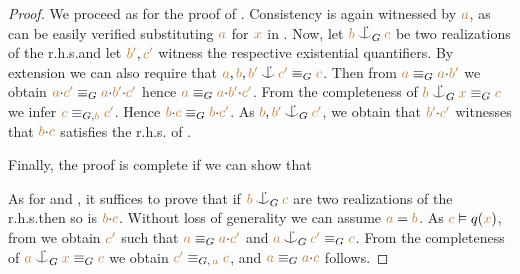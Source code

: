 \documentclass[creche.tex]{subfiles}
\begin{document}
\begin{proof}
We proceed as for the proof of .
Consistency is again witnessed by ${\color{brown} a}$, as can be easily verified substituting ${\color{brown} a}$ for ${\color{brown} x}$ in .
Now, let ${\mr b}\nonforkc_G{\mr c}$ be two realizations of the r.h.s.\@ and let ${\color{brown} b'},{\color{brown} c'}$ witness the respective existential quantifiers.
By extension we can also require that ${\mr a},{\mr b},{\mr b'}\nonforkc{\mr c'}\equiv_{G}{\mr c}$.
Then from ${\color{brown} a}\equiv_G{\color{brown} a}{\cdot}{\color{brown} b'}$ we obtain ${\color{brown} a}{\cdot}{\color{brown} c'}\equiv_G{\color{brown} a}{\cdot}{\color{brown} b'}{\cdot}{\color{brown} c'}$ hence ${\color{brown} a}\equiv_G{\color{brown} a}{\cdot}{\color{brown} b'}{\cdot}{\color{brown} c'}$.
From the completeness of ${\mr b}\nonforkc_G{\mr x}\equiv_G{\mr c}$ we infer ${\color{brown} c}\equiv_{G,{\color{brown} b}}{\color{brown} c'}$.
Hence ${\color{brown} b}{\cdot}{\color{brown} c}\equiv_G {\color{brown} b}{\cdot}{\color{brown} c'}$.
As ${\mr b},{\mr b'}\nonforkc_G{\mr c'}$, we obtain that ${\color{brown} b'}{\cdot}{\color{brown} c'}$ witnesses that ${\color{brown} b}{\cdot}{\color{brown} c}$ satisfies the r.h.s.
of .

Finally, the proof is complete if we can show that


As for  and , it suffices to prove that if ${\mr b}\nonforkc_G{\mr c}$ are two realizations of the r.h.s.\@ then so is ${\color{brown} b}{\cdot}{\color{brown} c}$.
Without loss of generality we can assume ${\color{brown} a}={\color{brown} b}$.
As ${\color{brown} c}\vDash q({\color{brown} x})$, from  we obtain ${\color{brown} c'}$ such that ${\color{brown} a}\equiv_G{\color{brown} a}{\cdot}{\color{brown} c'}$ and ${\mr a}\nonforkc_G{\mr c'}\equiv_G{\mr c}$.
From the completeness of ${\mr a}\nonforkc_G{\mr x}\equiv_G{\mr c}$ we obtain ${\color{brown} c'}\equiv_{G,\,{\color{brown} a}}{\color{brown} c}$, and ${\color{brown} a}\equiv_G{\color{brown} a}{\cdot}{\color{brown} c}$ follows.
\end{proof}
\end{document}
